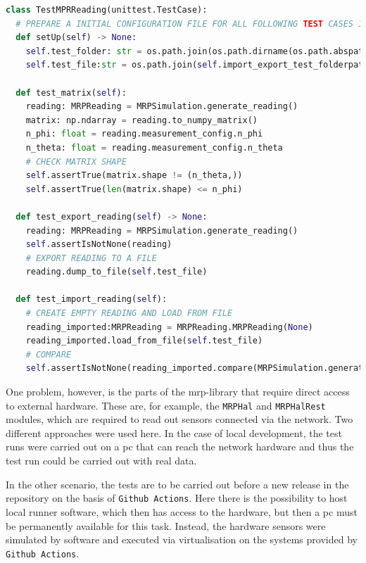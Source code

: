\begin{lstlisting}[language=Python, caption={Example pytest class for testing MRPReading module functions}, label=lst:pytest_example_code]
class TestMPRReading(unittest.TestCase):
  # PREPARE A INITIAL CONFIGURATION FILE FOR ALL FOLLOWING TEST CASES IN THIS FILE
  def setUp(self) -> None:
    self.test_folder: str = os.path.join(os.path.dirname(os.path.abspath(__file__)), "tmp")
    self.test_file:str = os.path.join(self.import_export_test_folderpath, "tmp")

  def test_matrix(self):
    reading: MRPReading = MRPSimulation.generate_reading()
    matrix: np.ndarray = reading.to_numpy_matrix()
    n_phi: float = reading.measurement_config.n_phi
    n_theta: float = reading.measurement_config.n_theta
    # CHECK MATRIX SHAPE
    self.assertTrue(matrix.shape != (n_theta,))
    self.assertTrue(len(matrix.shape) <= n_phi)

  def test_export_reading(self) -> None:
    reading: MRPReading = MRPSimulation.generate_reading()
    self.assertIsNotNone(reading)
    # EXPORT READING TO A FILE
    reading.dump_to_file(self.test_file)

  def test_import_reading(self):
    # CREATE EMPTY READING AND LOAD FROM FILE
    reading_imported:MRPReading = MRPReading.MRPReading(None)
    reading_imported.load_from_file(self.test_file)
    # COMPARE
    self.assertIsNotNone(reading_imported.compare(MRPSimulation.generate_reading()))
\end{lstlisting}

One problem, however, is the parts of the \gls{mrp}-library that require
direct access to external hardware. These are, for example, the
\passthrough{\lstinline!MRPHal!} and
\passthrough{\lstinline!MRPHalRest!} modules, which are required to read
out sensors connected via the network. Two different approaches were
used here. In the case of local development, the test runs were carried
out on a \gls{pc} that can reach the network hardware and thus the test
run could be carried out with real data.

In the other scenario, the tests are to be carried out before a new
release in the repository on the basis of
\passthrough{\lstinline!Github Actions!}\cite{GithubActions}. Here
there is the possibility to host local runner software, which then has
access to the hardware, but then a \gls{pc} must be permanently
available for this task. Instead, the hardware sensors were simulated by
software and executed via virtualisation on the systems provided by
\passthrough{\lstinline!Github Actions!}\cite{GithubActions}.

